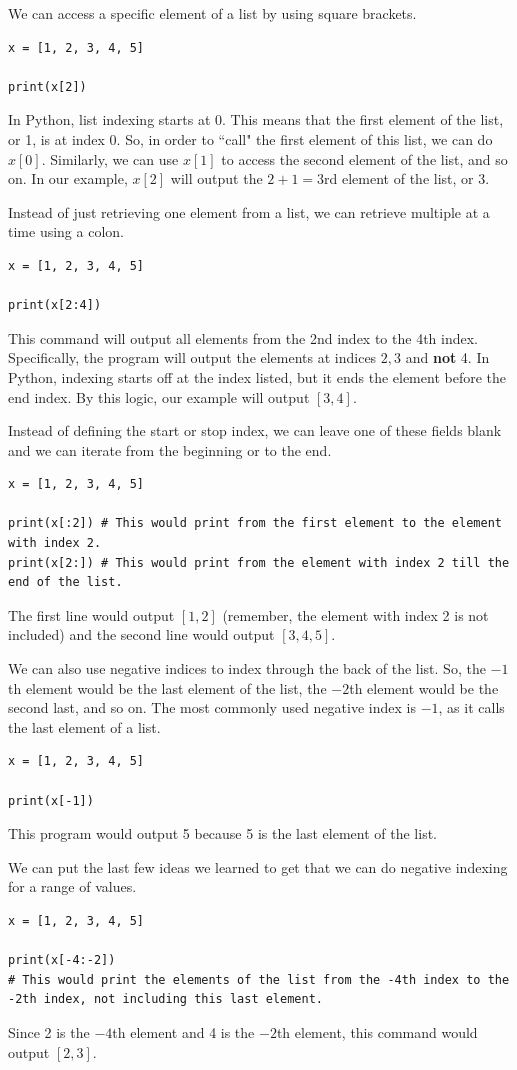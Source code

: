 \documentclass{article}
\begin{document}
We can access a specific element of a list by using square brackets. 
\begin{lstlisting}
x = [1, 2, 3, 4, 5]

print(x[2])
\end{lstlisting}
In Python, list indexing starts at 0. This means that the first element of the list, or 1, is at index 0. So, in order to ``call" the first element of this list, we can do $x[0]$. Similarly, we can use $x[1]$ to access the second element of the list, and so on. In our example, $x[2]$ will output the $2+1=3$rd element of the list, or 3. 

Instead of just retrieving one element from a list, we can retrieve multiple at a time using a colon.
\begin{lstlisting}
x = [1, 2, 3, 4, 5]

print(x[2:4])
\end{lstlisting}
This command will output all elements from the 2nd index to the 4th index. Specifically, the program will output the elements at indices $2,3$ and \textbf{not} 4. In Python, indexing starts off at the index listed, but it ends the element before the end index. By this logic, our example will output $[3, 4]$. 

Instead of defining the start or stop index, we can leave one of these fields blank and we can iterate from the beginning or to the end. 
\begin{lstlisting}
x = [1, 2, 3, 4, 5]

print(x[:2]) # This would print from the first element to the element with index 2.
print(x[2:]) # This would print from the element with index 2 till the end of the list. 
\end{lstlisting}
The first line would output $[1,2]$ (remember, the element with index 2 is not included) and the second line would output $[3,4,5]$. 

We can also use negative indices to index through the back of the list. So, the $-1$th element would be the last element of the list, the $-2$th element would be the second last, and so on. The most commonly used negative index is $-1$, as it calls the last element of a list. 
\begin{lstlisting}
x = [1, 2, 3, 4, 5]

print(x[-1])
\end{lstlisting}
This program would output 5 because 5 is the last element of the list. 

We can put the last few ideas we learned to get that we can do negative indexing for a range of values. 
\begin{lstlisting}
x = [1, 2, 3, 4, 5]

print(x[-4:-2])
# This would print the elements of the list from the -4th index to the -2th index, not including this last element.
\end{lstlisting}
Since 2 is the $-4$th element and 4 is the $-2$th element, this command would output $[2,3]$.
\end{document}
